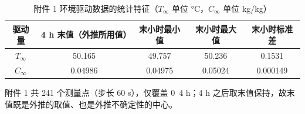 \begin{table}[htbp]
  \centering
  \caption{附件 1 环境驱动数据的统计特征（$T_\infty$ 单位 °C，$C_\infty$ 单位 kg/kg）}
  \label{tab:ambient-stats}
  \scriptsize
  \begin{tabular}{ccccc}
    \toprule
    驱动量 & 4 h 末值（外推所用值） & 末小时最小值 & 末小时最大值 & 末小时标准差 \\
    \midrule
    $T_\infty$ & 50.165 & 49.757 & 50.236 & 0.1531 \\
    $C_\infty$ & 0.04986 & 0.04975 & 0.05024 & 0.000149 \\
    \bottomrule
  \end{tabular}
  \par\smallskip\footnotesize 附件 1 共 241 个测量点（步长 60 s），仅覆盖 0~4 h；4 h 之后取末值保持，故末值既是外推的取值、也是外推不确定性的中心。
\end{table}
